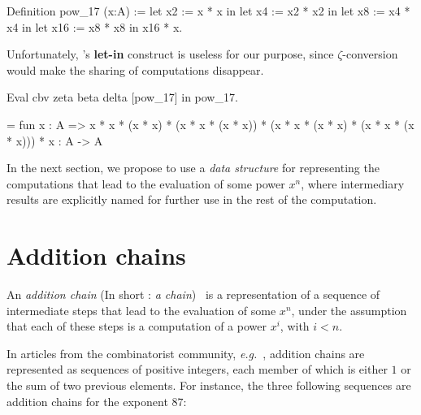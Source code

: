\begin{Coqsrc}
Definition pow_17  (x:A) :=
  let x2 := x * x in
  let x4 := x2 * x2 in
  let x8 := x4 * x4 in
  let x16 := x8 * x8 in
  x16 * x.
\end{Coqsrc}
\label{pow-17-let-in}

Unfortunately, \coq's \textbf{let-in} construct is useless for our purpose, since $\zeta$-conversion 
would make the sharing of computations disappear.

\begin{Coqsrc}
Eval cbv  zeta beta delta [pow_17]  in  pow_17.
\end{Coqsrc}

\begin{Coqanswer}
 = fun x : A =>
       x * x * (x * x) * (x * x * (x * x)) *
       (x * x * (x * x) * (x * x * (x * x))) * x
     : A -> A 
\end{Coqanswer}
                                                                                                                                                                                                                                                                                                                                                                                                                                                                                                                                                                                                                                                                                                                                                                                                                                   
In the next section, we propose to use a \emph{data structure} for representing 
the computations that lead to the evaluation of some power $x^n$, where
intermediary results are explicitly named for further use in the rest of the computation.




\section{Addition chains}
An \emph{addition chain} (In short : \emph{a chain})~\cite{brauer1939} is a representation of a sequence of
intermediate steps that lead to the evaluation of some $x^n$, under the 
assumption that each of these steps is a computation of  a power $x^i$, with 
$i<n$.

In articles from the combinatorist  community, 
\emph{e.g.}~\cite{brauer1939,DBLP:journals/ipl/BerstelB87},  addition chains 
are represented as sequences of positive integers, each member of which 
is either $1$ or  the sum of two previous elements.
For instance, the three following sequences are addition chains for the exponent $87$:


